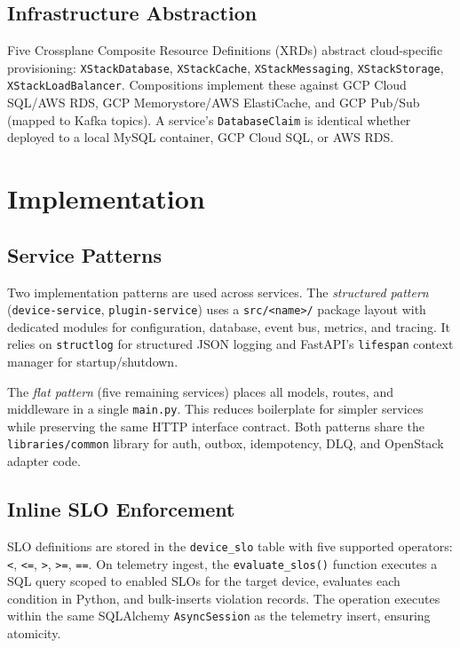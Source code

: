 \documentclass[twocolumn,smallextended]{svjour3}
\begin{document}
\subsection{Infrastructure Abstraction}
Five Crossplane Composite Resource Definitions (XRDs) abstract cloud-specific
provisioning: \texttt{XStackDatabase}, \texttt{XStackCache},
\texttt{XStackMessaging}, \texttt{XStackStorage}, \texttt{XStackLoadBalancer}.
Compositions implement these against GCP Cloud SQL/AWS RDS,
GCP Memorystore/AWS ElastiCache, and GCP Pub/Sub (mapped to Kafka topics).
A service's \texttt{DatabaseClaim} is identical whether deployed to a
local MySQL container, GCP Cloud SQL, or AWS RDS.

\section{Implementation}
\label{sec:implementation}

\subsection{Service Patterns}
Two implementation patterns are used across services.
The \emph{structured pattern} (\texttt{device-service}, \texttt{plugin-service})
uses a \texttt{src/<name>/} package layout with dedicated modules for
configuration, database, event bus, metrics, and tracing.
It relies on \texttt{structlog} for structured JSON logging and FastAPI's
\texttt{lifespan} context manager for startup/shutdown.

The \emph{flat pattern} (five remaining services) places all models, routes,
and middleware in a single \texttt{main.py}. This reduces boilerplate for
simpler services while preserving the same HTTP interface contract.
Both patterns share the \texttt{libraries/common} library for auth, outbox,
idempotency, DLQ, and OpenStack adapter code.

\subsection{Inline SLO Enforcement}
\label{sec:slo-impl}
SLO definitions are stored in the \texttt{device\_slo} table with five
supported operators: \texttt{<}, \texttt{<=}, \texttt{>}, \texttt{>=},
\texttt{==}. On telemetry ingest, the \texttt{evaluate\_slos()} function
executes a SQL query scoped to enabled SLOs for the target device,
evaluates each condition in Python, and bulk-inserts violation records.
The operation executes within the same SQLAlchemy \texttt{AsyncSession}
as the telemetry insert, ensuring atomicity.
\end{document}
